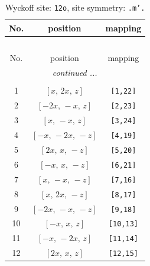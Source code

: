\documentclass[fleqn,8pt]{jsarticle}
\begin{document}
\begin{longtable}{ccc}
\caption{Wyckoff site: {\tt 12o}, site symmetry: {\tt .m'.}}
 \\
 \hline \hline
No. & position & mapping \\ \hline \endfirsthead

\multicolumn{2}{l}{\tablename\ \thetable{}} \\
 \hline \hline
No. & position & mapping \\ \hline \endhead

 \hline \hline
\multicolumn{2}{r}{\footnotesize\it continued ...} \\ \endfoot

 \hline \hline
\multicolumn{2}{r}{} \\ \endlastfoot

1 & $\left[ x,\, 2 x,\, z \right]$ & {\tt [1,22]} \\ \hline
2 & $\left[ - 2 x,\, - x,\, z \right]$ & {\tt [2,23]} \\ \hline
3 & $\left[ x,\, - x,\, z \right]$ & {\tt [3,24]} \\ \hline
4 & $\left[ - x,\, - 2 x,\, - z \right]$ & {\tt [4,19]} \\ \hline
5 & $\left[ 2 x,\, x,\, - z \right]$ & {\tt [5,20]} \\ \hline
6 & $\left[ - x,\, x,\, - z \right]$ & {\tt [6,21]} \\ \hline
7 & $\left[ x,\, - x,\, - z \right]$ & {\tt [7,16]} \\ \hline
8 & $\left[ x,\, 2 x,\, - z \right]$ & {\tt [8,17]} \\ \hline
9 & $\left[ - 2 x,\, - x,\, - z \right]$ & {\tt [9,18]} \\ \hline
10 & $\left[ - x,\, x,\, z \right]$ & {\tt [10,13]} \\ \hline
11 & $\left[ - x,\, - 2 x,\, z \right]$ & {\tt [11,14]} \\ \hline
12 & $\left[ 2 x,\, x,\, z \right]$ & {\tt [12,15]} \\
\end{longtable}
\renewcommand{\arraystretch}{1.2}
\end{document}
